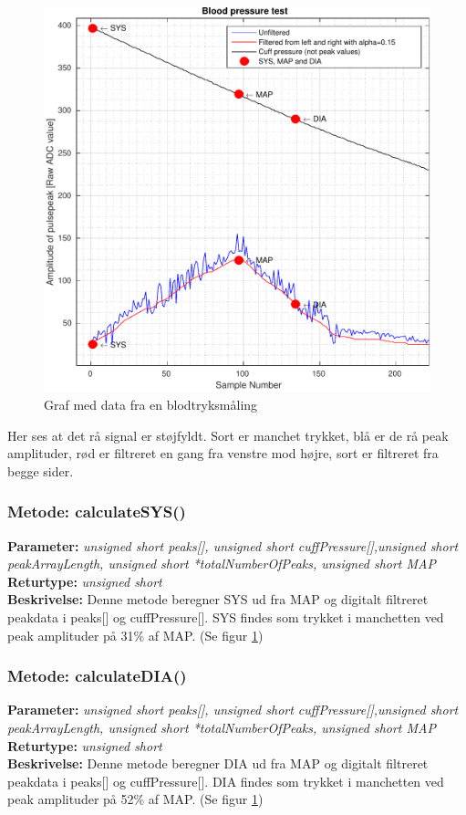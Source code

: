 \newpage
\begin{figure}[H]
	\includegraphics[width=\textwidth]{billeder/Alpha015-crop.pdf}
	\caption{Graf med data fra en blodtryksmåling}\label{fig:bpMeasurement}
\end{figure}
Her ses at det rå signal er støjfyldt. Sort er manchet trykket, blå er de rå peak amplituder, rød er filtreret en gang fra venstre mod højre, sort	er filtreret fra begge sider.

\subsubsection{Metode: calculateSYS()}
\textbf{Parameter: } \textit{unsigned short peaks[], unsigned short cuffPressure[],unsigned short peakArrayLength, unsigned short *totalNumberOfPeaks, unsigned short MAP}
\\ \textbf{Returtype: } \textit{unsigned short}
\\ \textbf{Beskrivelse: } Denne metode beregner SYS ud fra MAP og digitalt filtreret peakdata i peaks[] og cuffPressure[]. SYS findes som trykket i manchetten ved peak amplituder på 31\% af MAP. (Se figur \ref{fig:bpMeasurement})

\subsubsection{Metode: calculateDIA()}
\textbf{Parameter: } \textit{unsigned short peaks[], unsigned short cuffPressure[],unsigned short peakArrayLength, unsigned short *totalNumberOfPeaks, unsigned short MAP}
\\ \textbf{Returtype: } \textit{unsigned short}
\\ \textbf{Beskrivelse: } Denne metode beregner DIA ud fra MAP og digitalt filtreret peakdata i peaks[] og cuffPressure[]. DIA findes som trykket i manchetten ved peak amplituder på 52\% af MAP. (Se figur \ref{fig:bpMeasurement})

